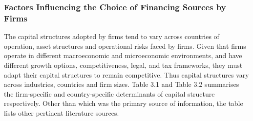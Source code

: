 \documentclass[a4paper, nobind]{templates/ociamthesis}
\begin{document}
\hypertarget{factors-influencing-the-choice-of-financing-sources-by-firms}{%
\subsubsection{Factors Influencing the Choice of Financing Sources by Firms}\label{factors-influencing-the-choice-of-financing-sources-by-firms}}

The capital structures adopted by firms tend to vary across countries of operation, asset structures and operational risks faced by firms. Given that firms operate in different macroeconomic and microeconomic environments, and have different growth options, competitiveness, legal, and tax frameworks, they must adapt their capital structures to remain competitive. Thus capital structures vary across industries, countries and firm sizes. Table 3.1 and Table 3.2 summarises the firm-specific and country-specific determinants of capital structure respectively. Other than \textcite{moyo2013modelling} which was the primary source of information, the table lists other pertinent literature sources.
\end{document}
